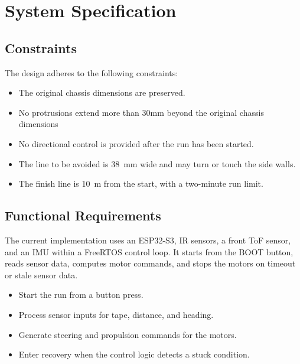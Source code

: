 \chapter{System Specification}

\section{Constraints}
The design adheres to the following constraints:
\begin{itemize}
    \item The original chassis dimensions are preserved.
    \item No protrusions extend more than 30mm beyond the original chassis dimensions
    \item No directional control is provided after the run has been started.
    \item The line to be avoided is 38~mm wide and may turn or touch the side walls.
    \item The finish line is 10~m from the start, with a two-minute run limit.
\end{itemize}

\section{Functional Requirements}
The current implementation uses an ESP32-S3, IR sensors, a front ToF sensor, and an IMU within a FreeRTOS control loop. It starts from the BOOT button, reads sensor data, computes motor commands, and stops the motors on timeout or stale sensor data.
\begin{itemize}
    \item Start the run from a button press.
    \item Process sensor inputs for tape, distance, and heading.
    \item Generate steering and propulsion commands for the motors.
    \item Enter recovery when the control logic detects a stuck condition.
\end{itemize}